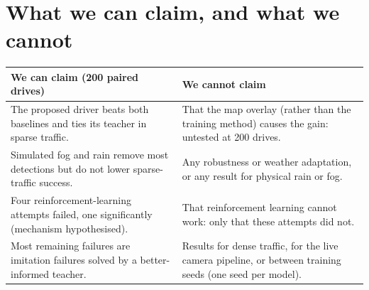 \section{What we can claim, and what we cannot}
\begin{center}\small
\begin{tabularx}{\textwidth}{@{}>{\raggedright\arraybackslash}p{5.4cm}X@{}}\toprule
We can claim (200 paired drives) & We cannot claim\\\midrule
The proposed driver beats both baselines and ties its teacher in sparse traffic. & That the map overlay (rather than the training method) causes the gain: untested at 200 drives.\\
Simulated fog and rain remove most detections but do not lower sparse-traffic success. & Any robustness or weather adaptation, or any result for physical rain or fog.\\
Four reinforcement-learning attempts failed, one significantly (mechanism hypothesised). & That reinforcement learning cannot work: only that these attempts did not.\\
Most remaining failures are imitation failures solved by a better-informed teacher. & Results for dense traffic, for the live camera pipeline, or between training seeds (one seed per model).\\\bottomrule
\end{tabularx}
\end{center}

